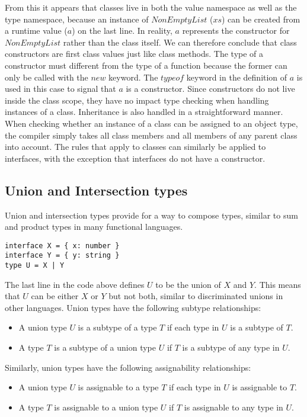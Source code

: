 From this it appears that classes live in both the value namespace as well as the type namespace,
because an instance of $NonEmptyList$ ($xs$) can be created from a runtime value ($a$) on the last line.
In reality, $a$ represents the constructor for $NonEmptyList$ rather than the class itself.
We can therefore conclude that class constructors are first class values just like class methods.
The type of a constructor must different from the type of a function because the former can only be called with the $new$ keyword.
The $typeof$ keyword in the definition of $a$ is used in this case to signal that $a$ is a constructor.
Since constructors do not live inside the class scope, they have no impact type checking when handling instances of a class.
\bigskip
Inheritance is also handled in a straightforward manner.
When checking whether an instance of a class can be assigned to an object type, the compiler
simply takes all class members and all members of any parent class into account.
The rules that apply to classes can similarly be applied to interfaces, with the exception that interfaces do not have a constructor.

\subsection{Union and Intersection types}
Union and intersection types provide for a way to compose types, similar to sum and product types in many functional languages.
\begin{lstlisting}
interface X = { x: number }
interface Y = { y: string }
type U = X | Y
\end{lstlisting}

The last line in the code above defines $U$ to be the union of $X$ and $Y$. 
This means that $U$ can be either $X$ or $Y$ but not both, similar to discriminated unions in other languages.
Union types have the following subtype relationships:
\begin{itemize}
\item A union type $U$ is a subtype of a type $T$ if each type in $U$ is a subtype of $T$.
\item A type $T$ is a subtype of a union type $U$ if $T$ is a subtype of any type in $U$.
\end{itemize}
Similarly, union types have the following assignability relationships:
\begin{itemize}
\item A union type $U$ is assignable to a type $T$ if each type in $U$ is assignable to $T$.
\item A type $T$ is assignable to a union type $U$ if $T$ is assignable to any type in $U$.
\end{itemize}

